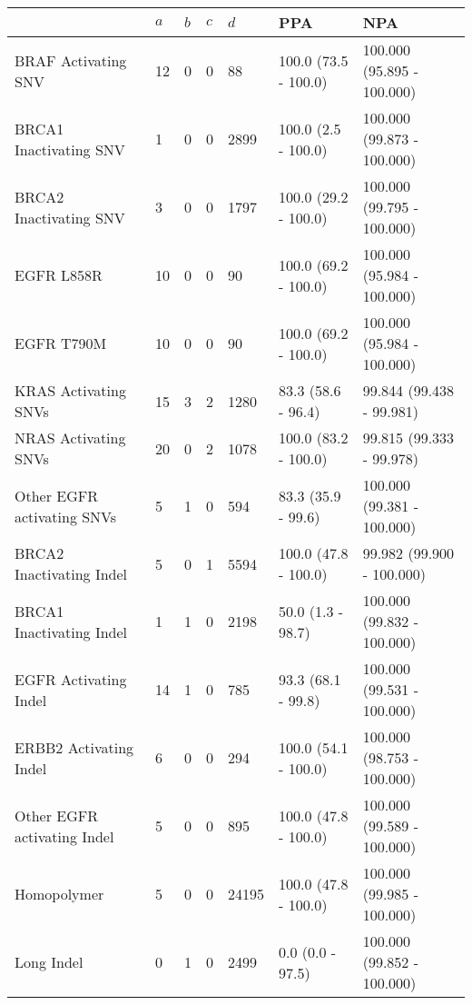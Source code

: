 \begin{tabular}{|l|l|l|l|l|l|l|}
\hline
\rowcolor[gray]{.85}{}                           & \textbf{$a$} & \textbf{$b$} & \textbf{$c$} & \textbf{$d$} & \textbf{PPA} & \textbf{                         NPA }\\ \hline
BRAF Activating SNV         &   12 &    0 &    0 &     88 &  100.0 (73.5 - 100.0) &  100.000 (95.895 - 100.000) \\ \hline
BRCA1 Inactivating SNV      &    1 &    0 &    0 &   2899 &   100.0 (2.5 - 100.0) &  100.000 (99.873 - 100.000) \\ \hline
BRCA2 Inactivating SNV      &    3 &    0 &    0 &   1797 &  100.0 (29.2 - 100.0) &  100.000 (99.795 - 100.000) \\ \hline
EGFR L858R                  &   10 &    0 &    0 &     90 &  100.0 (69.2 - 100.0) &  100.000 (95.984 - 100.000) \\ \hline
EGFR T790M                  &   10 &    0 &    0 &     90 &  100.0 (69.2 - 100.0) &  100.000 (95.984 - 100.000) \\ \hline
KRAS Activating SNVs        &   15 &    3 &    2 &   1280 &    83.3 (58.6 - 96.4) &    99.844 (99.438 - 99.981) \\ \hline
NRAS Activating SNVs        &   20 &    0 &    2 &   1078 &  100.0 (83.2 - 100.0) &    99.815 (99.333 - 99.978) \\ \hline
Other EGFR activating SNVs  &    5 &    1 &    0 &    594 &    83.3 (35.9 - 99.6) &  100.000 (99.381 - 100.000) \\ \hline
BRCA2 Inactivating Indel    &    5 &    0 &    1 &   5594 &  100.0 (47.8 - 100.0) &   99.982 (99.900 - 100.000) \\ \hline
BRCA1 Inactivating Indel    &    1 &    1 &    0 &   2198 &     50.0 (1.3 - 98.7) &  100.000 (99.832 - 100.000) \\ \hline
EGFR Activating Indel       &   14 &    1 &    0 &    785 &    93.3 (68.1 - 99.8) &  100.000 (99.531 - 100.000) \\ \hline
ERBB2 Activating Indel      &    6 &    0 &    0 &    294 &  100.0 (54.1 - 100.0) &  100.000 (98.753 - 100.000) \\ \hline
Other EGFR activating Indel &    5 &    0 &    0 &    895 &  100.0 (47.8 - 100.0) &  100.000 (99.589 - 100.000) \\ \hline
Homopolymer                 &    5 &    0 &    0 &  24195 &  100.0 (47.8 - 100.0) &  100.000 (99.985 - 100.000) \\ \hline
Long Indel                  &    0 &    1 &    0 &   2499 &      0.0 (0.0 - 97.5) &  100.000 (99.852 - 100.000) \\ \hline

\end{tabular}
